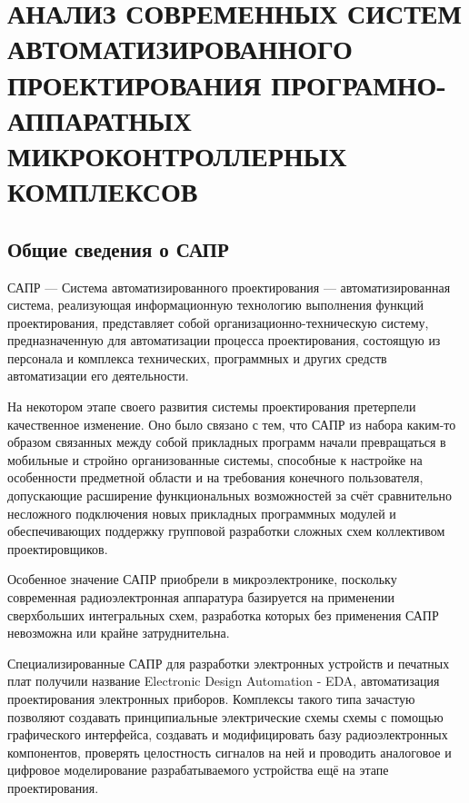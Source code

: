 

\section{АНАЛИЗ СОВРЕМЕННЫХ СИСТЕМ АВТОМАТИЗИРОВАННОГО ПРОЕКТИРОВАНИЯ ПРОГРАМНО-АППАРАТНЫХ МИКРОКОНТРОЛЛЕРНЫХ КОМПЛЕКСОВ}

\subsection{Общие сведения о САПР}
\begin{par}
САПР --- Система автоматизированного проектирования --- автоматизированная система, реализующая
информационную технологию выполнения функций проектирования, представляет собой
организационно-техническую систему, предназначенную для автоматизации процесса проектирования,
состоящую из персонала и комплекса технических, программных и других средств
автоматизации его деятельности.
\end{par}

\begin{par}
На некотором этапе своего развития системы проектирования претерпели качественное изменение.
Оно было связано с тем, что САПР из набора каким-то образом связанных между собой прикладных
программ начали превращаться в мобильные и стройно организованные системы, способные к
настройке на особенности предметной области и на требования конечного пользователя,
допускающие расширение функциональных возможностей за счёт сравнительно несложного подключения
новых прикладных программных модулей и обеспечивающих поддержку групповой разработки сложных схем
коллективом проектировщиков.
\end{par}

\begin{par}
Особенное значение САПР приобрели в микроэлектронике, поскольку современная радиоэлектронная аппаратура базируется на применении сверхбольших интегральных схем, разработка которых без применения САПР невозможна или крайне затруднительна.
\end{par}

\begin{par}
Специализированные САПР для разработки электронных устройств и печатных плат получили название
Electronic Design Automation - EDA, автоматизация проектирования электронных приборов.
Комплексы такого типа зачастую позволяют создавать принципиальные электрические схемы схемы с
помощью графического интерфейса, создавать и модифицировать  базу радиоэлектронных компонентов,
проверять целостность сигналов на ней и проводить аналоговое и цифровое моделирование
разрабатываемого устройства ещё на этапе проектирования.
\end{par}


